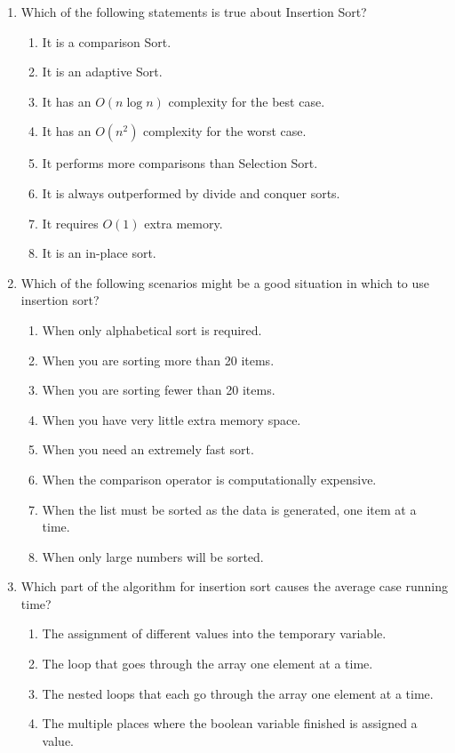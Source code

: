 \documentclass{article}
\begin{document}
\begin{enumerate}
	\item Which of the following statements is true about Insertion Sort?
		\begin{enumerate}[label=\alph*.]
			\item It is a comparison Sort.
			\item It is an adaptive Sort.
			\item It has an \(O(n \log n)\) complexity for the best case.
			\item It has an \(O(n^2 )\) complexity for the worst case.
			\item It performs more comparisons than Selection Sort.
			\item It is always outperformed by divide and conquer sorts.
			\item It requires \(O(1)\) extra memory.
			\item It is an in-place sort.
		\end{enumerate}
	\newpage
	\item Which of the following scenarios might be a good situation in which to use insertion sort?
		\begin{enumerate}[label=\alph*.]
			\item When only alphabetical sort is required.
			\item When you are sorting more than 20 items.
			\item When you are sorting fewer than 20 items.
			\item When you have very little extra memory space.
			\item When you need an extremely fast sort.
			\item When the comparison operator is computationally expensive.
			\item When the list must be sorted as the data is generated, one item at a time.
			\item When only large numbers will be sorted.
		\end{enumerate}
	\item Which part of the algorithm for insertion sort causes the average case running time?
		\begin{enumerate}[label=\alph*.]
			\item The assignment of different values into the temporary variable.
			\item The loop that goes through the array one element at a time.
			\item The nested loops that each go through the array one element at a time.
			\item The multiple places where the boolean variable finished is assigned a value.

\end{enumerate}
\end{enumerate}
\end{document}
